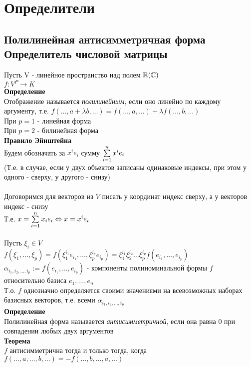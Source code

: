 \documentclass[12pt]{article}
\begin{document}
\section{Определители}
\subsection{Полилинейная антисимметричная форма\\Определитель числовой матрицы}
Пусть V - линейное пространство над полем $\mathbb{R}(\mathbb{C})$\\
$f: V^P \rightarrow K$\\
\textbf{Определение}\\
Отображение называется \textit{полилинейным}, если оно линейно по каждому аргументу, т.е. $f(\ldots, a+\lambda b, \ldots) = f(\ldots, a, \ldots) + \lambda f(\ldots,b,\ldots)$\\
При $p = 1$ - линейная форма\\
При $p = 2$ - билинейная форма\\
\textbf{Правило Эйнштейна}\\
Будем обозначать за $x^i e_i$ сумму $\sum\limits_{i=1}^n x^ie_i$\\
(Т.е. в случае, если у двух объектов записаны одинаковые индексы, при этом у одного - сверху, у другого - снизу)\\\\
Договоримся для векторов из $V$ писать у координат индекс сверху, а у векторов индекс - снизу\\
Т.е. $x=\sum\limits_{i=1}^n x_ie_i \Leftrightarrow x = x^ie_i$\\\\
Пусть $\xi_i \in V$\\
$f(\xi_1, \ldots, \xi_p) = f(\xi_1^{i_1}e_{i_1}, \ldots, \xi_p^{i_p}e_{i_p}) = \xi_1^{i_1}\xi_2^{i_2}\ldots\xi_p^{i_p}f(e_{i_1}, \ldots, e_{i_p})$\\
$\alpha_{i_1,i_2,\ldots, i_p} := f(e_{i_1}, \ldots, e_{i_p})$ - компоненты полиноминальной формы $f$ относительно базиса $e_1, \ldots, e_n$\\
Т.о. $f$ однозначно определяется своими значениями на всевозможных наборах базисных векторов, т.е. всеми $\alpha_{i_1,i_2,\ldots, i_p}$\\
\textbf{Определение}\\
Полилинейная форма называется \textit{антисимметричной}, если она равна 0 при совпадении любых двух аргументов\\
\textbf{Теорема}\\
$f$ антисимметрична тогда и только тогда, когда $f(\ldots,a,\ldots, b,\ldots) = -f(\ldots, b, \ldots, a, \ldots)$\\
\end{document}
